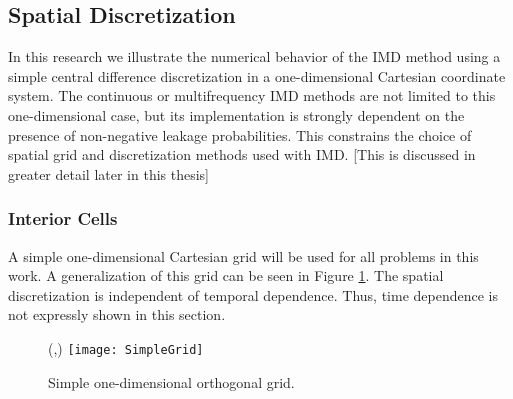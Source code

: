 \subsection{Spatial Discretization}
\label{sec:Transport-Discret}

\noindent
	\indent In this research we illustrate the numerical behavior of the IMD method using a simple central difference discretization in a  one-dimensional Cartesian coordinate system. The continuous or multifrequency IMD methods are not limited to this one-dimensional case, but its implementation is strongly dependent on the presence of non-negative leakage probabilities. This constrains the choice of spatial grid and discretization methods used with IMD. [This is discussed in greater detail later in this thesis]
	
\subsubsection{Interior Cells}
\label{sec:Transport-Discret-Interior-Cells}

\noindent
	\indent A simple one-dimensional Cartesian grid will be used for all problems in this work. A generalization of this grid can be seen in Figure \ref{fig:SimpleGrid}. The spatial discretization is independent of temporal dependence. Thus, time dependence is not expressly shown in this section. 

\begin{figure}[htbp]
	\begin{center}
		\centering
		\begin{picture}(\width,\height)
	                {\texttt{[image: SimpleGrid]}}
		\end{picture}
		\caption{\label{fig:SimpleGrid} Simple one-dimensional orthogonal grid.}
	\end{center}
\end{figure}

